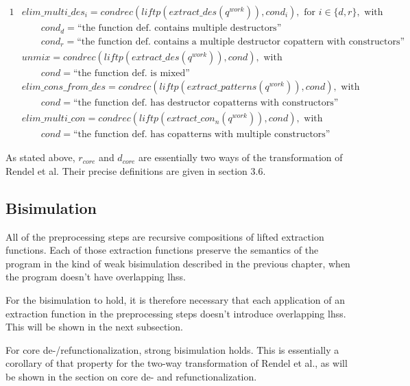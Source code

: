 \begin{framed}

\begin{alignat*}{1}
&elim\_multi\_des_i = condrec(liftp(extract\_des(q^{work})), cond_i), \textrm{ for } i \in \{d, r\}, \textrm{ with } \\
&\qquad cond_d = \textrm{``the function def. contains multiple destructors''} \\
&\qquad cond_r = \textrm{``the function def. contains a multiple destructor copattern with constructors''} \\
&unmix = condrec(liftp(extract\_des(q^{work})), cond), \textrm{ with}\\
&\qquad cond = \textrm{``the function def. is mixed''} \\
&elim\_cons\_from\_des = condrec(liftp(extract\_patterns(q^{work})), cond), \textrm{ with}\\
&\qquad cond = \textrm{``the function def. has destructor copatterns with constructors''} \\
&elim\_multi\_con = condrec(liftp(extract\_con_n(q^{work})), cond), \textrm{ with}\\
&\qquad cond = \textrm{``the function def. has copatterns with multiple constructors''}
\end{alignat*}

\end{framed}

As stated above, $r_{core}$ and $d_{core}$ are essentially two ways of the transformation of Rendel et al. Their precise definitions are given in section 3.6.

\subsection{Bisimulation}

All of the preprocessing steps are recursive compositions of lifted extraction functions. Each of those extraction functions preserve the semantics of the program in the kind of weak bisimulation described in the previous chapter, when the program doesn't have overlapping lhss.

For the bisimulation to hold, it is therefore necessary that each application of an extraction function in the preprocessing steps doesn't introduce overlapping lhss. This will be shown in the next subsection.

For core de-/refunctionalization, strong bisimulation holds. This is essentially a corollary of that property for the two-way transformation of Rendel et al., as will be shown in the section on core de- and refunctionalization.

